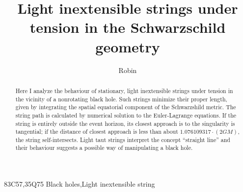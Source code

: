 \documentclass[times,twocolumn,final]{elsarticle}
\begin{document}

\begin{frontmatter}

\title{Light inextensible strings under tension in the Schwarzschild geometry}

\author[1]{Robin }

\address[1]{Auckland University of Technology, 2-14 Wakefield Street,
  Auckland 1142, New Zealand}




\begin{abstract}
Here I analyze the behaviour of stationary, light inextensible strings
under tension in the vicinity of a nonrotating black hole.  Such
strings minimize their proper length, given by integrating the spatial
equatorial component of the Schwarzshild metric.  The string path is
calculated by numerical solution to the Euler-Lagrange equations.  If
the string is entirely outside the event horizon, its closest approach
is to the singularity is tangential; if the distance of closest
approach is less than about $1.076109317\cdot(2GM)$, the string
self-intersects.  Light taut strings interpret the concept ``straight
line'' and their behaviour suggests a possible way of manipulating a
black hole.
\end{abstract}

\begin{keyword}
\MSC 83C57\sep 35Q75
\KWD Black holes\sep Light inextensible string
\end{keyword}

\end{frontmatter}


\end{document}
